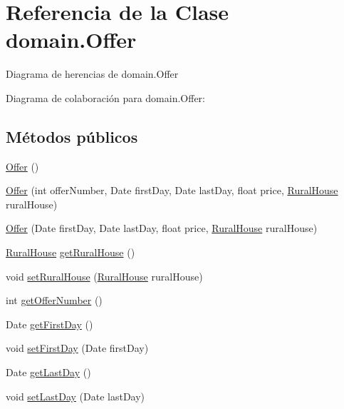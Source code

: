 \hypertarget{classdomain_1_1_offer}{}\section{Referencia de la Clase domain.\+Offer}
\label{classdomain_1_1_offer}


Diagrama de herencias de domain.\+Offer


Diagrama de colaboración para domain.\+Offer\+:
\subsection*{Métodos públicos}
\begin{DoxyCompactItemize}
\item 
\mbox{\hyperlink{classdomain_1_1_offer_ae82665e8df101e5a20b41dc06f74a789}{Offer}} ()
\item 
\mbox{\hyperlink{classdomain_1_1_offer_a86a7d5eec8c0f93f844e15e057a34555}{Offer}} (int offer\+Number, Date first\+Day, Date last\+Day, float price, \mbox{\hyperlink{classdomain_1_1_rural_house}{Rural\+House}} rural\+House)
\item 
\mbox{\hyperlink{classdomain_1_1_offer_ae977cf0dae1332eb9d0b97252cc15078}{Offer}} (Date first\+Day, Date last\+Day, float price, \mbox{\hyperlink{classdomain_1_1_rural_house}{Rural\+House}} rural\+House)
\item 
\mbox{\hyperlink{classdomain_1_1_rural_house}{Rural\+House}} \mbox{\hyperlink{classdomain_1_1_offer_a3804f5f9ad3a3bf380e55389ccfa9dba}{get\+Rural\+House}} ()
\item 
void \mbox{\hyperlink{classdomain_1_1_offer_a2050ed4cf76a2a2863d08e89bdf4a7df}{set\+Rural\+House}} (\mbox{\hyperlink{classdomain_1_1_rural_house}{Rural\+House}} rural\+House)
\item 
int \mbox{\hyperlink{classdomain_1_1_offer_ab9e27c474ec6819a27eac1847d876c3a}{get\+Offer\+Number}} ()
\item 
Date \mbox{\hyperlink{classdomain_1_1_offer_ae13ac55ba469cb34e004d6aff68430fb}{get\+First\+Day}} ()
\item 
void \mbox{\hyperlink{classdomain_1_1_offer_aca5c8e3d34e700c8e51d1c9a0685e68f}{set\+First\+Day}} (Date first\+Day)
\item 
Date \mbox{\hyperlink{classdomain_1_1_offer_a8bf48365a8fc185dbdcaac80a9d84444}{get\+Last\+Day}} ()
\item 
void \mbox{\hyperlink{classdomain_1_1_offer_a52363278771059c51820160889c2bed1}{set\+Last\+Day}} (Date last\+Day)

\end{DoxyCompactItemize}
